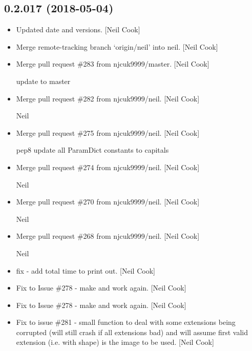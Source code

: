 \documentclass[a4paper,10pt,english]{report}
\begin{document}
\subsection{0.2.017 (2018-05-04)}
\label{\detokenize{misc/changelog:id443}}\begin{itemize}
\item {} 
Updated date and versions. {[}Neil Cook{]}

\item {} 
Merge remote-tracking branch ‘origin/neil’ into neil. {[}Neil Cook{]}

\item {} 
Merge pull request \#283 from njcuk9999/master. {[}Neil Cook{]}

update to master

\item {} 
Merge pull request \#282 from njcuk9999/neil. {[}Neil Cook{]}

Neil

\item {} 
Merge pull request \#275 from njcuk9999/neil. {[}Neil Cook{]}

pep8 update all ParamDict constants to capitals

\item {} 
Merge pull request \#274 from njcuk9999/neil. {[}Neil Cook{]}

Neil

\item {} 
Merge pull request \#270 from njcuk9999/neil. {[}Neil Cook{]}

Neil

\item {} 
Merge pull request \#268 from njcuk9999/neil. {[}Neil Cook{]}

Neil

\item {} 
 fix - add total time to  print out. {[}Neil Cook{]}

\item {} 
Fix to Issue \#278 - make  and
 work again. {[}Neil Cook{]}

\item {} 
Fix to Issue \#278 - make  and
 work again. {[}Neil Cook{]}

\item {} 
Fix to issue \#281 - small function to deal with some extensions being
corrupted (will still crash if all extensions bad) and will assume
first valid extension (i.e. with shape) is the image to be used. {[}Neil
Cook{]}


\end{itemize}
\end{document}
